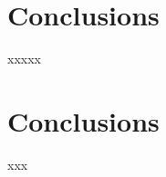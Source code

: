 \documentclass[draft]{aa}
\begin{document}
\section{Conclusions}
 \label{sec:conclusions}

 xxxxx








\section{Conclusions}

xxx
\end{document}
